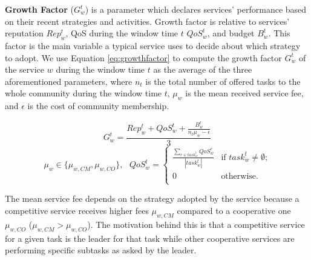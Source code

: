 \textbf{Growth Factor} ($G_w^t$) is a parameter which declares
services' performance based on their recent strategies and
activities. Growth factor is relative to services' reputation
$Rep_w^t$, QoS during the window time $t$ $QoS_w^t$, and budget
$B_w^t$. This factor is the main variable a typical service uses
to decide about which strategy to adopt. We use Equation \ref{eq:growthfactor} to compute the
growth factor $G^t_w$ of the service $w$ during the window time
$t$ as the average of the three aforementioned parameters, where
$n_t$ is the total number of offered tasks to the whole community
during the
window time $t$, %
$\mu_w$ is the mean received service fee, and $\epsilon$ is the
cost of community membership.

\begin{equation}\label{eq:growthfactor}
G^t_w = \frac{Rep^t_w + QoS_w^t+\frac{B_w^t}{n_t  \mu_w -
\epsilon}}{3}
\end{equation}
\begin{equation*}
\mu_{w} \in\{\mu_{w, CM}, \mu_{w, CO}\},~~~QoS_w^t =
\begin{cases} \frac{\sum_{r \in
task_w^t}QoS_w^r}{|task_w^t|}& \text{if $task_w^t \neq \emptyset$;}\\
0 & \text{otherwise.}\\
\end{cases}
\end{equation*}


The mean
service fee depends on the strategy adopted by the service because
a competitive service receives higher fees $\mu_{w, CM}$ compared
to a cooperative one $\mu_{w, CO}$ ($\mu_{w, CM} > \mu_{w, CO}$).
The motivation behind this is that a competitive service for a
given task is the leader for that task while other cooperative
services are performing specific subtasks as asked by the leader.



